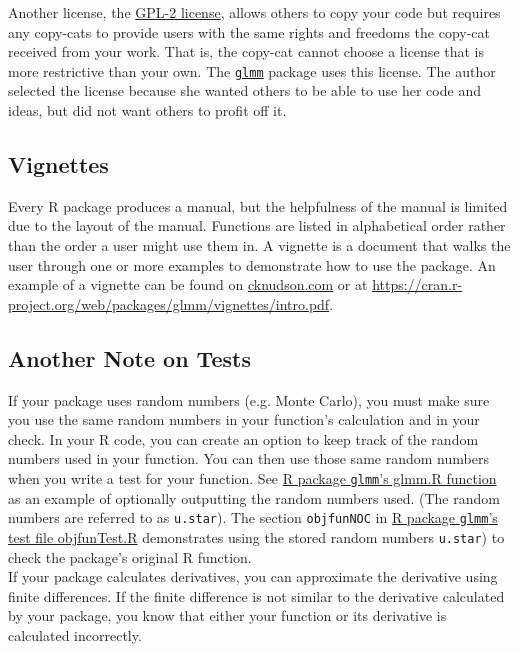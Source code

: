 \documentclass{article}
\begin{document}
Another license, the \href{https://cran.r-project.org/web/licenses/GPL-2}{GPL-2 license}, allows others to copy your code but requires any copy-cats to provide users with the same rights and freedoms the copy-cat received from your  work. That  is, the copy-cat cannot choose a license that is more restrictive than your own. The \href{https://cran.r-project.org/web/packages/glmm/index.html}{\texttt{glmm}} package uses this license. The author selected the license because she wanted others to be able to use her code and ideas, but did not want others to profit off it.  


\subsection{Vignettes}
Every R package produces a manual, but the helpfulness of the manual is limited due to the layout of the manual. Functions are listed in alphabetical order rather than the order a user might use them in. A vignette is a document that walks the user through one or more examples to demonstrate how to use the package. An example of a vignette can be found on \href{cknudson.com}{\url{cknudson.com}} or at  \href{https://cran.r-project.org/web/packages/glmm/vignettes/intro.pdf}{\url{https://cran.r-project.org/web/packages/glmm/vignettes/intro.pdf}}.

\subsection{Another Note on Tests}
If your package uses random numbers (e.g. Monte Carlo), you must make sure you use the same random numbers in your function's calculation and in your check. In your R code, you can create an option to  keep track of the random numbers used in your function. You can then use those same random numbers when you write a test for your function. See \href{https://github.com/knudson1/glmm/blob/master2/glmm/R/glmm.R}{R package \texttt{glmm}'s glmm.R function} as an example of optionally outputting the random numbers used. (The random numbers are referred to as \texttt{u.star}). The section \texttt{objfunNOC} in \href{https://github.com/knudson1/glmm/blob/master2/glmm/tests/objfunTest.R}{R package \texttt{glmm}'s test file objfunTest.R} demonstrates  using the stored random numbers \texttt{u.star}) to check the package's original R function.\\

If your package calculates derivatives, you can approximate the derivative using finite differences. If the finite difference is not similar to the derivative calculated by your package, you know that either your function or its derivative is calculated incorrectly.  \\
\end{document}
